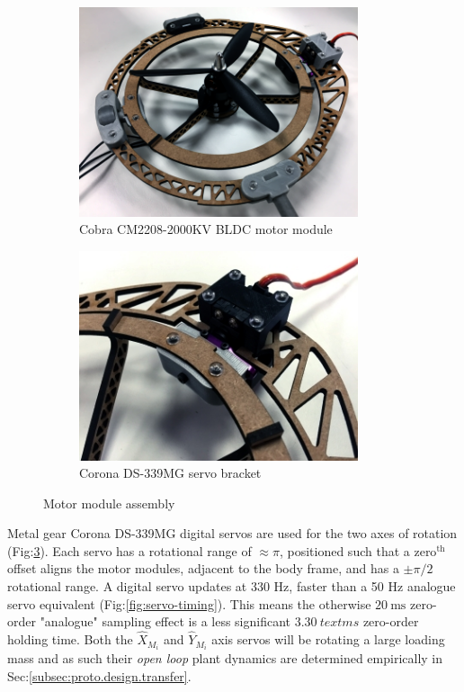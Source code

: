 \begin{figure}[htbp]
\centering
\begin{subfigure}{0.49\textwidth}
\centering
\includegraphics[width=0.9\textwidth]{figs/motor-bldc}
\caption{Cobra CM2208-2000KV BLDC motor module}
\label{fig:bldc-motor}
\end{subfigure}
\begin{subfigure}{0.49\textwidth}
\centering
\includegraphics[width=0.9\textwidth]{figs/motor-servo}
\caption{Corona DS-339MG servo bracket}
\label{fig:motor-servo}
\end{subfigure}
\vspace{-5pt}
\caption{Motor module assembly}
\vspace{-15pt}
\end{figure}
\par
Metal gear Corona DS-339MG digital servos are used for the two axes of rotation (Fig:\ref{fig:motor-servo}). Each servo has a rotational range of $\approx\pi$, positioned such that a $\text{zero}^{\text{th}}$ offset aligns the motor modules, adjacent to the body frame, and has a $\pm\pi/2$ rotational range. A digital servo updates at 330 Hz, faster than a 50 Hz analogue servo equivalent (Fig:\ref{fig:servo-timing}). This means the otherwise $20~\text{ms}$ zero-order "analogue" sampling effect is a less significant $3.30~text{ms}$ zero-order holding time. Both the $\hat{X}_{M_i}$ and $\hat{Y}_{M_i}$ axis servos will be rotating a large loading mass and as such their \emph{open loop} plant dynamics are determined empirically in Sec:\ref{subsec:proto.design.transfer}.
